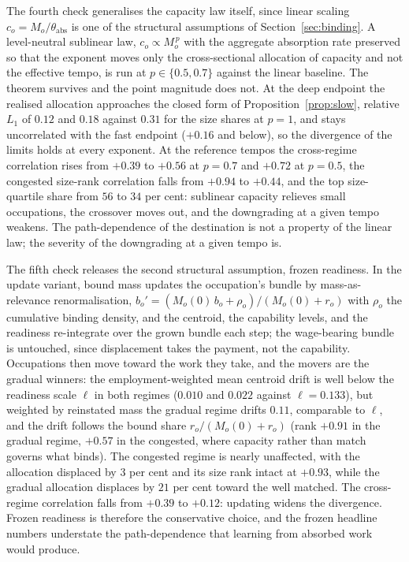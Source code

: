 \documentclass[12pt, a4paper]{article}
\begin{document}
The fourth check generalises the capacity law itself, since linear
scaling $c_o = M_o/\theta_{\text{abs}}$ is one of the structural
assumptions of Section~\ref{sec:binding}. A level-neutral sublinear law,
$c_o \propto M_o^{\,p}$ with the aggregate absorption rate preserved so
that the exponent moves only the cross-sectional allocation of capacity
and not the effective tempo, is run at $p \in \{0.5, 0.7\}$ against the
linear baseline. The theorem survives and the point magnitude does not.
At the deep endpoint the realised allocation approaches the closed form
of Proposition~\ref{prop:slow}, relative $L_1$ of $0.12$ and $0.18$
against $0.31$ for the size shares at $p = 1$, and stays uncorrelated with the
fast endpoint ($+0.16$ and below), so the divergence of the limits holds
at every exponent. At the reference tempos the cross-regime correlation
rises from $+0.39$ to $+0.56$ at $p = 0.7$ and $+0.72$ at $p = 0.5$, the
congested size-rank correlation falls from $+0.94$ to $+0.44$, and the
top size-quartile share from $56$ to $34$ per cent: sublinear capacity
relieves small occupations, the crossover moves out, and the downgrading
at a given tempo weakens. The path-dependence of the destination is not
a property of the linear law; the severity of the downgrading at a given
tempo is.

The fifth check releases the second structural assumption, frozen
readiness. In the update variant, bound mass updates the occupation's
bundle by mass-as-relevance renormalisation,
$b_o' = (M_o(0)\,b_o + \rho_o)/(M_o(0) + r_o)$ with $\rho_o$ the
cumulative binding density, and the centroid, the capability levels, and
the readiness re-integrate over the grown bundle each step; the
wage-bearing bundle is untouched, since displacement takes the payment,
not the capability. Occupations then move toward the work they take,
and the movers are the gradual winners: the employment-weighted mean
centroid drift is well below the readiness scale $\ell$ in both
regimes ($0.010$ and $0.022$ against $\ell = 0.133$), but weighted by reinstated mass the gradual regime drifts
$0.11$, comparable to $\ell$, and the drift follows the bound share
$r_o/(M_o(0)+r_o)$ (rank $+0.91$ in the gradual regime, $+0.57$ in the
congested, where capacity rather than match governs what binds). The congested regime is nearly
unaffected, with the allocation displaced by $3$ per cent and its size
rank intact at $+0.93$, while the gradual allocation displaces by $21$
per cent toward the well matched. The cross-regime correlation falls
from $+0.39$ to $+0.12$: updating widens the divergence. Frozen
readiness is therefore the conservative choice, and the frozen headline
numbers understate the path-dependence that learning from absorbed work
would produce.
\end{document}
